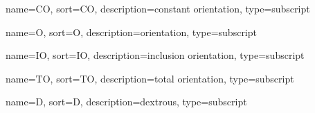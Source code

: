 
	{%
		name={\ensuremath{\mathrm{CO}}},
		sort=CO,
		description=constant orientation,
		type=subscript
	}
	\newcommand{\constantOrientation}{\gls{sub:constantOrientation}}

	{%
		name={\ensuremath{\mathrm{O}}},
		sort=O,
		description=orientation,
		type=subscript
	}
	\newcommand{\orientation}{\gls{sub:orientation}}

	{%
		name={\ensuremath{\mathrm{IO}}},
		sort=IO,
		description=inclusion orientation,
		type=subscript
	}
	\newcommand{\inclusionOrientation}{\gls{sub:inclusionOrientation}}

	{%
		name={\ensuremath{\mathrm{TO}}},
		sort=TO,
		description=total orientation,
		type=subscript
	}
	\newcommand{\totalOrientation}{\gls{sub:totalOrientation}}

	{%
		name={\ensuremath{\mathrm{D}}},
		sort=D,
		description=dextrous,
		type=subscript
	}
	\newcommand{\dextrous}{\gls{sub:dextrous}}
